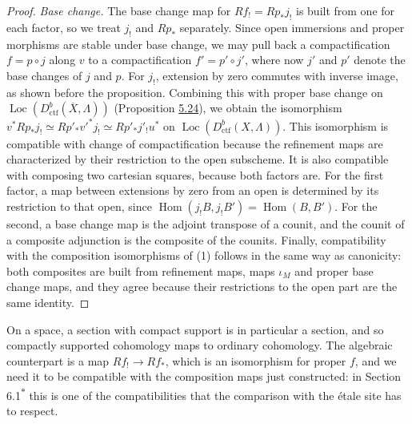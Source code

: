\documentclass[11pt]{article}
\newcommand{\bpout}[1]{#1\textsuperscript{\hyperlink{bp-outside}{\ensuremath{\ast}}}}
\providecommand{\Hom}{}\renewcommand{\Hom}{\operatorname{Hom}}
\providecommand{\Loc}{}\renewcommand{\Loc}{\operatorname{Loc}}
\begin{document}
\begin{proof}[{Proof}]
\emph{Base change.} The base change map for \(Rf_!=Rp_*j_!\) is built from one for each factor, so we treat \(j_!\) and \(Rp_*\) separately. Since open immersions and proper morphisms are stable under base change, we may pull back a compactification \(f=p\circ j\) along \(v\) to a compactification \(f'=p'\circ j'\), where now \(j'\) and \(p'\) denote the base changes of \(j\) and \(p\). For \(j_!\), extension by zero commutes with inverse image, as shown before the proposition. Combining this with proper base change on \(\Loc(D^b_{\mathrm{ctf}}(\overline X,\Lambda))\) (Proposition \hyperref[bp82]{5.24}), we obtain the isomorphism \(v^*Rp_*j_!\simeq Rp'_*v'^*j_!\simeq Rp'_*j'_!u^*\) on \(\Loc(D^b_{\mathrm{ctf}}(X,\Lambda))\). This isomorphism is compatible with change of compactification because the refinement maps are characterized by their restriction to the open subscheme. It is also compatible with composing two cartesian squares, because both factors are. For the first factor, a map between extensions by zero from an open is determined by its restriction to that open, since \(\Hom(j_!B,j_!B')=\Hom(B,B')\). For the second, a base change map is the adjoint transpose of a counit, and the counit of a composite adjunction is the composite of the counits. Finally, compatibility with the composition isomorphisms of (1) follows in the same way as canonicity: both composites are built from refinement maps, maps \(\iota_M\) and proper base change maps, and they agree because their restrictions to the open part are the same identity.
\end{proof}

\label{bp92}%
On a space, a section with compact support is in particular a section, and so compactly supported cohomology maps to ordinary cohomology. The algebraic counterpart is a map \(Rf_!\to Rf_*\), which is an isomorphism for proper \(f\), and we need it to be compatible with the composition maps just constructed: in Section \bpout{6.1} this is one of the compatibilities that the comparison with the étale site has to respect.
\end{document}
